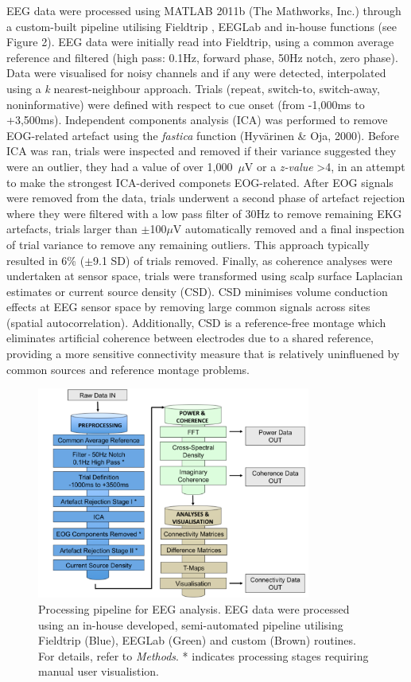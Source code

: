 \documentclass[preprint,authoryear,11pt,5p,times,twocolumns]{elsarticle}
\begin{document}
EEG data were processed using MATLAB 2011b (The Mathworks, Inc.) through a custom-built pipeline utilising Fieldtrip \citep{Oostenveld}, EEGLab \citep{Delorme} and in-house functions (see Figure 2). EEG data were initially read into Fieldtrip, using a common average reference and filtered (high pass: 0.1Hz, forward phase, 50Hz notch, zero phase). Data were visualised for noisy channels and if any were detected, interpolated using a \textit{k} nearest-neighbour approach. Trials (repeat, switch-to, switch-away, noninformative) were defined with respect to cue onset (from -1,000ms to +3,500ms). Independent components analysis (ICA) was performed to remove EOG-related artefact using the \textit{fastica} function (Hyv\"{a}rinen \& Oja, 2000). Before ICA was ran, trials were inspected and removed if their variance suggested they were an outlier, they had a value of over 1,000~$\mu$V or a \textit{z-value} \textgreater 4, in an attempt to make the strongest ICA-derived componets EOG-related. After EOG signals were removed from the data, trials underwent a second phase of artefact rejection where they were filtered with a low pass filter of 30Hz to remove remaining EKG artefacts, trials larger than $\pm$100$\mu$V automatically removed and a final inspection of trial variance to remove any remaining outliers. This approach typically resulted in 6\% ($\pm$9.1 SD) of trials removed. Finally, as coherence analyses were undertaken at sensor space, trials were transformed using scalp surface Laplacian estimates or current source density (CSD). CSD minimises volume conduction effects at EEG sensor space by removing large common signals across sites (spatial autocorrelation). Additionally, CSD is a reference-free montage which eliminates artificial coherence between electrodes due to a shared reference, providing a more sensitive connectivity measure that is relatively uninfluened by common sources and reference montage problems.
\begin{figure}[ht!]
\centering
\includegraphics[width=90mm]{Figure2.pdf}
\caption{Processing pipeline for EEG analysis. EEG data were processed using an in-house developed, semi-automated pipeline utilising Fieldtrip (Blue), EEGLab (Green) and custom (Brown) routines. For details, refer to \emph{Methods}. * indicates processing stages requiring manual user visualistion.}
\label{Pipeline}
\end{figure}
\end{document}
